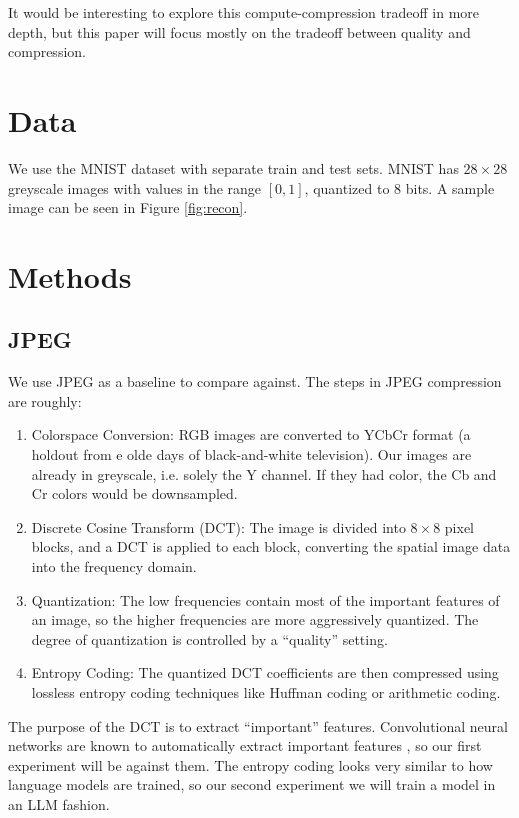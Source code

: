 \documentclass[11pt]{article}
\begin{document}
It would be interesting to explore this compute-compression tradeoff in more depth, but this paper will focus mostly on the tradeoff between quality and compression.

\section{Data}

We use the MNIST dataset with separate train and test sets. MNIST has $28\times 28$ greyscale images with values in the range $[0, 1]$, quantized to 8 bits. A sample image can be seen in Figure \ref{fig:recon}.

\section{Methods}
\subsection{JPEG}
We use JPEG as a baseline to compare against. The steps in JPEG compression are roughly:
\begin{enumerate}
    \item Colorspace Conversion: RGB images are converted to YCbCr format (a holdout from \th e olde days of black-and-white television). Our images are already in greyscale, i.e. solely the Y channel. If they had color, the Cb and Cr colors would be downsampled.
    \item Discrete Cosine Transform (DCT): The image is divided into $8\times8$ pixel blocks, and a DCT is applied to each block, converting the spatial image data into the frequency domain.
    \item Quantization: The low frequencies contain most of the important features of an image, so the higher frequencies are more aggressively quantized. The degree of quantization is controlled by a ``quality'' setting.
    \item Entropy Coding: The quantized DCT coefficients are then compressed using lossless entropy coding techniques like Huffman coding or arithmetic coding.
\end{enumerate}
The purpose of the DCT is to extract ``important'' features. Convolutional neural networks are known to automatically extract important features \citep{erhan-2009-features}, so our first experiment will be against them. The entropy coding looks very similar to how language models are trained, so our second experiment we will train a model in an LLM fashion.
\end{document}
